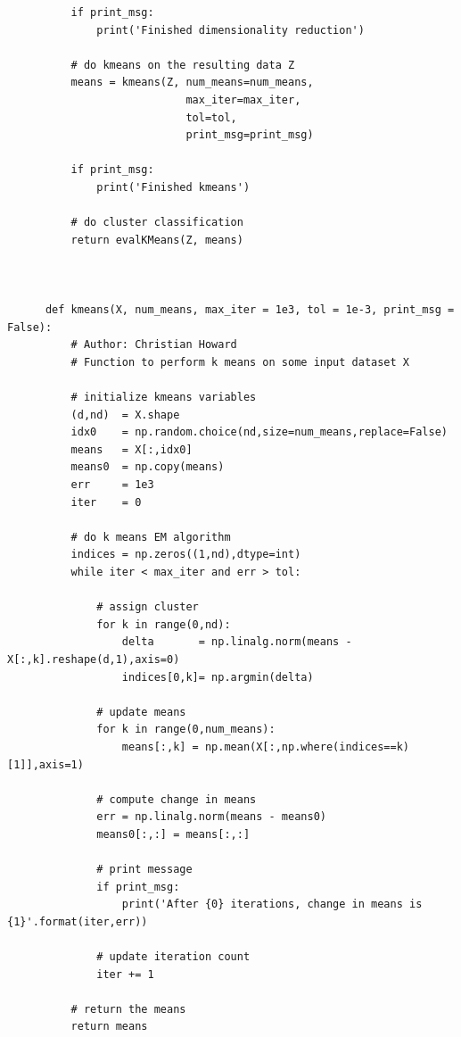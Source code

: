 \documentclass{article}[12pt]
\begin{document}
\begin{verbatim}
          if print_msg:
              print('Finished dimensionality reduction')

          # do kmeans on the resulting data Z
          means = kmeans(Z, num_means=num_means,
                            max_iter=max_iter,
                            tol=tol,
                            print_msg=print_msg)

          if print_msg:
              print('Finished kmeans')

          # do cluster classification
          return evalKMeans(Z, means)



      def kmeans(X, num_means, max_iter = 1e3, tol = 1e-3, print_msg = False):
          # Author: Christian Howard
          # Function to perform k means on some input dataset X

          # initialize kmeans variables
          (d,nd)  = X.shape
          idx0    = np.random.choice(nd,size=num_means,replace=False)
          means   = X[:,idx0]
          means0  = np.copy(means)
          err     = 1e3
          iter    = 0

          # do k means EM algorithm
          indices = np.zeros((1,nd),dtype=int)
          while iter < max_iter and err > tol:

              # assign cluster
              for k in range(0,nd):
                  delta       = np.linalg.norm(means - X[:,k].reshape(d,1),axis=0)
                  indices[0,k]= np.argmin(delta)

              # update means
              for k in range(0,num_means):
                  means[:,k] = np.mean(X[:,np.where(indices==k)[1]],axis=1)

              # compute change in means
              err = np.linalg.norm(means - means0)
              means0[:,:] = means[:,:]

              # print message
              if print_msg:
                  print('After {0} iterations, change in means is {1}'.format(iter,err))

              # update iteration count
              iter += 1

          # return the means
          return means
\end{verbatim}
\end{document}
